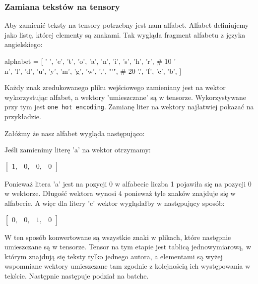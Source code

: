 \newpage
\subsubsection{Zamiana tekstów na tensory}
Aby zamienić teksty na tensory potrzebny jest nam alfabet. Alfabet definiujemy jako listę, której 
elementy są znakami. Tak wygląda fragment alfabetu z języka angielskiego:
\begin{python}
alphabet = [
    ' ',
    'e',
    't',
    'o',
    'a',
    'n',
    'i',
    's',
    'h',
    'r',  # 10
    '\\n',
    'l',
    'd',
    'u',
    'y',
    'm',
    'g',
    'w',
    ',',
    "'",  # 20
    '.',
    'f',
    'c',
    'b',
]
\end{python}

Każdy znak zredukowanego pliku wejściowego zamieniany jest na wektor wykorzystując alfabet, 
a wektory 'umieszczane' są w tensorze. Wykorzystywane przy tym jest \texttt{one hot encoding}.
Zamianę liter na wektory najłatwiej pokazać na przykładzie.

Załóżmy że nasz alfabet wygląda następująco:

Jeśli zamienimy literę 'a' na wektor otrzymamy: 
 
\vspace{2mm}
$
\begin{bmatrix} 
1, & 0, & 0, & 0
\end{bmatrix} 
$
\vspace{2mm}

Ponieważ litera 'a' jest na pozycji 0 w alfabecie liczba 1 pojawiła się na pozycji 0 w wektorze.
Długość wektora wynosi 4 ponieważ tyle znaków znajduje się w alfabecie. A więc dla litery 
'c' wektor wyglądałby w następujący sposób:

\vspace{2mm}
$
\begin{bmatrix} 
0, & 0, & 1, & 0
\end{bmatrix} 
$
\vspace{2mm}

W ten sposób konwertowane są wszystkie znaki w plikach, które następnie umieszczane są w tensorze.
Tensor na tym etapie jest tablicą jednowymiarową, w którym znajdują się teksty tylko jednego autora, 
a elementami są wyżej wspomniane wektory umieszczane tam zgodnie z kolejnością ich występowania w tekście. 
Następnie następuje podział na batche.

